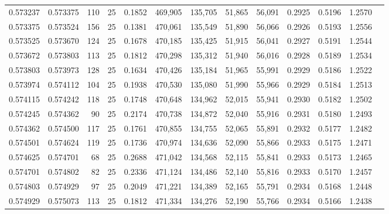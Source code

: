 \begin{tabular}{rrrrrrrrrrrrr}
0.573237 & 0.573375 &   110 &  25 &                                     0.1852 & 469,905 & 135,705 &  51,865 &  56,091 & 0.2925 & 0.5196 & 1.2570 \\
0.573375 & 0.573524 &   156 &  25 &                                     0.1381 & 470,061 & 135,549 &  51,890 &  56,066 & 0.2926 & 0.5193 & 1.2556 \\
0.573525 & 0.573670 &   124 &  25 &                                     0.1678 & 470,185 & 135,425 &  51,915 &  56,041 & 0.2927 & 0.5191 & 1.2544 \\
0.573672 & 0.573803 &   113 &  25 &                                     0.1812 & 470,298 & 135,312 &  51,940 &  56,016 & 0.2928 & 0.5189 & 1.2534 \\
0.573803 & 0.573973 &   128 &  25 &                                     0.1634 & 470,426 & 135,184 &  51,965 &  55,991 & 0.2929 & 0.5186 & 1.2522 \\
0.573974 & 0.574112 &   104 &  25 &                                     0.1938 & 470,530 & 135,080 &  51,990 &  55,966 & 0.2929 & 0.5184 & 1.2513 \\
0.574115 & 0.574242 &   118 &  25 &                                     0.1748 & 470,648 & 134,962 &  52,015 &  55,941 & 0.2930 & 0.5182 & 1.2502 \\
0.574245 & 0.574362 &    90 &  25 &                                     0.2174 & 470,738 & 134,872 &  52,040 &  55,916 & 0.2931 & 0.5180 & 1.2493 \\
0.574362 & 0.574500 &   117 &  25 &                                     0.1761 & 470,855 & 134,755 &  52,065 &  55,891 & 0.2932 & 0.5177 & 1.2482 \\
0.574501 & 0.574624 &   119 &  25 &                                     0.1736 & 470,974 & 134,636 &  52,090 &  55,866 & 0.2933 & 0.5175 & 1.2471 \\
0.574625 & 0.574701 &    68 &  25 &                                     0.2688 & 471,042 & 134,568 &  52,115 &  55,841 & 0.2933 & 0.5173 & 1.2465 \\
0.574701 & 0.574802 &    82 &  25 &                                     0.2336 & 471,124 & 134,486 &  52,140 &  55,816 & 0.2933 & 0.5170 & 1.2457 \\
0.574803 & 0.574929 &    97 &  25 &                                     0.2049 & 471,221 & 134,389 &  52,165 &  55,791 & 0.2934 & 0.5168 & 1.2448 \\
0.574929 & 0.575073 &   113 &  25 &                                     0.1812 & 471,334 & 134,276 &  52,190 &  55,766 & 0.2934 & 0.5166 & 1.2438 \\

\end{tabular}
